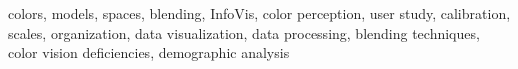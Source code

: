 
\begin{IEEEkeywords}
colors, models, spaces, blending, InfoVis, color perception, user study, calibration, scales, organization, data visualization, data processing, blending techniques, color vision deficiencies, demographic analysis
\end{IEEEkeywords}
